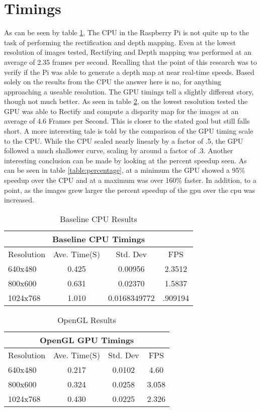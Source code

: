 \thispagestyle{plain}
\section{Timings}
As can be seen by table \ref{table:cpu}, The CPU in the Raspberry Pi is not quite up to the task of performing the rectification and depth mapping.  Even at the lowest resolution of images tested, Rectifying and Depth mapping was performed at an average of 2.35 frames per second.  Recalling that the point of this research was to verify if the Pi was able to generate a depth map at near real-time speeds.  Based solely on the results from the CPU the answer here is no, for anything approaching a useable resolution.  The GPU timings tell a slightly different story, though not much better.  As seen in table \ref{table:gpu}, on the lowest resolution tested the GPU was able to Rectify and compute a disparity map for the images at an average of 4.6 Frames per Second.  This is closer to the stated goal but still falls short.  A more interesting tale is told by the comparison of the GPU timing scale to the CPU.  While the CPU scaled nearly linearly by a factor of .5, the GPU followed a much shallower curve, scaling by around a factor of .3.  Another interesting conclusion can be made by looking at the percent speedup seen.  As can be seen in table \ref{table:percentage}, at a minimum the GPU showed a 95\% speedup over the CPU and at a maximum was over 160\% faster.  In addition, to a point, as the images grew larger the percent speedup of the gpu over the cpu was increased. 
\begin{table}
\label{table:cpu}
\begin{tabular}{|l|c|c|c|}
\hline
\multicolumn{4}{|c|}{Baseline CPU Timings} \\ \hline
Resolution & Ave. Time(S) & Std. Dev & FPS \\ \hline\hline
640x480 & 0.425 & 0.00956 & 2.3512 \\ \hline
800x600 & 0.631 & 0.02370 & 1.5837 \\ \hline
1024x768 & 1.010 & 0.0168349772 & .909194 \\ \hline
\end{tabular}
\caption{Baseline CPU Results}
\end{table}

\begin{table}
\label{table:gpu}
\begin{tabular}{|l|c|c|c|}
\hline
\multicolumn{4}{|c|}{OpenGL GPU Timings} \\ \hline
Resolution & Ave. Time(S) & Std. Dev & FPS \\ \hline\hline
640x480 & 0.217 & 0.0102 & 4.60 \\ \hline
800x600 & 0.324 & 0.0258 & 3.058 \\ \hline
1024x768 & 0.430 & 0.0225 & 2.326 \\ \hline
\end{tabular}
\caption{OpenGL Results}
\end{table}

